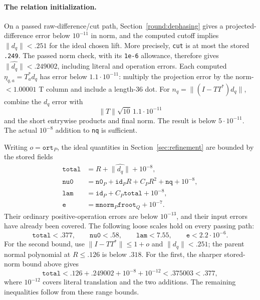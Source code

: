 \paragraph{The relation initialization.}
On a passed raw-difference/cut path,
Section~\ref{round:dephasing} gives a projected-difference error below
$10^{-11}$ in norm, and the computed cutoff implies
$\|d_q\|<.251$ for the ideal chosen lift.
More precisely, \texttt{cut} is at most the stored \texttt{.249}.
The passed norm check, with its \texttt{1e-6} allowance, therefore
gives $\widehat{\|d_q\|}<.249002$, including literal and operation errors.
Each computed $\eta_{q,a}=T_a^*d_q$ has error below
$1.1\cdot10^{-11}$: multiply the projection error by the
norm-$<1.00001$ T column and include a length-36 dot.
For $n_q=\|(I-TT^*)d_q\|$, combine the $d_q$ error with
\[
 \|T\|\sqrt{10}\,1.1\cdot10^{-11}
\]
and the short entrywise products and final norm.  The result is below
$5\cdot10^{-11}$.  The actual $10^{-8}$ addition to
\texttt{nq} is sufficient.

Writing $o=\mathtt{ort}_P$, the ideal quantities in
Section~\ref{sec:refinement} are bounded by the stored fields
\[
 \begin{split}
 \mathtt{total}&=R+\widehat{\|d_q\|}+10^{-8},\\
 \mathtt{nu0}&=\mathtt{n0}_P+\mathtt{id}_P R+C_P R^2
                    +\mathtt{nq}+10^{-8},\\
 \mathtt{lam}&=\mathtt{id}_P+C_P\mathtt{total}+10^{-8},\\
 \mathtt{e}&=\mathtt{mnorm}_P\mathtt{froot}_Q+10^{-7}.
 \end{split}
\]
Their ordinary positive-operation errors are below $10^{-13}$,
and their input errors have already been covered.
The following loose scales hold on every passing path:
\begin{equation}\label{round:b-init-scales}
 \mathtt{total}<.377,\qquad \mathtt{nu0}<.58,\qquad
 \mathtt{lam}<7.55,\qquad \mathtt{e}<2.2\cdot10^{-6}.
\end{equation}
For the second bound, use
$\|I-TT^*\|\le1+o$ and $\|d_q\|<.251$; the parent normal polynomial
at $R\le.126$ is below $.318$.
For the first, the sharper stored-norm bound above gives
\[
 \mathtt{total}<.126+.249002+10^{-8}+10^{-12}<.375003<.377,
\]
where $10^{-12}$ covers literal translation and the two additions.
The remaining inequalities follow from these range bounds.


